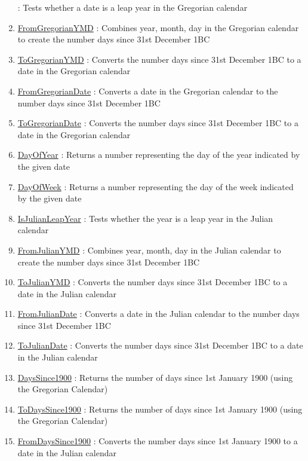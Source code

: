 \begin{enumerate}
: Tests whether a date is a leap year in the Gregorian calendar
\item \hyperlink{ecldoc:date.fromgregorianymd}{FromGregorianYMD}
: Combines year, month, day in the Gregorian calendar to create the number days since 31st December 1BC
\item \hyperlink{ecldoc:date.togregorianymd}{ToGregorianYMD}
: Converts the number days since 31st December 1BC to a date in the Gregorian calendar
\item \hyperlink{ecldoc:date.fromgregoriandate}{FromGregorianDate}
: Converts a date in the Gregorian calendar to the number days since 31st December 1BC
\item \hyperlink{ecldoc:date.togregoriandate}{ToGregorianDate}
: Converts the number days since 31st December 1BC to a date in the Gregorian calendar
\item \hyperlink{ecldoc:date.dayofyear}{DayOfYear}
: Returns a number representing the day of the year indicated by the given date
\item \hyperlink{ecldoc:date.dayofweek}{DayOfWeek}
: Returns a number representing the day of the week indicated by the given date
\item \hyperlink{ecldoc:date.isjulianleapyear}{IsJulianLeapYear}
: Tests whether the year is a leap year in the Julian calendar
\item \hyperlink{ecldoc:date.fromjulianymd}{FromJulianYMD}
: Combines year, month, day in the Julian calendar to create the number days since 31st December 1BC
\item \hyperlink{ecldoc:date.tojulianymd}{ToJulianYMD}
: Converts the number days since 31st December 1BC to a date in the Julian calendar
\item \hyperlink{ecldoc:date.fromjuliandate}{FromJulianDate}
: Converts a date in the Julian calendar to the number days since 31st December 1BC
\item \hyperlink{ecldoc:date.tojuliandate}{ToJulianDate}
: Converts the number days since 31st December 1BC to a date in the Julian calendar
\item \hyperlink{ecldoc:date.dayssince1900}{DaysSince1900}
: Returns the number of days since 1st January 1900 (using the Gregorian Calendar)
\item \hyperlink{ecldoc:date.todayssince1900}{ToDaysSince1900}
: Returns the number of days since 1st January 1900 (using the Gregorian Calendar)
\item \hyperlink{ecldoc:date.fromdayssince1900}{FromDaysSince1900}
: Converts the number days since 1st January 1900 to a date in the Julian calendar

\end{enumerate}
